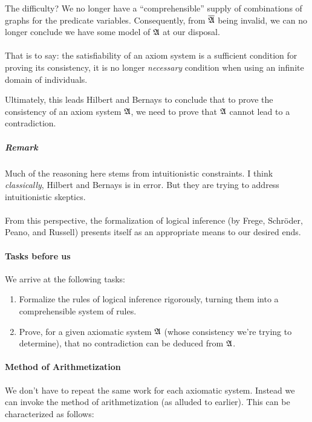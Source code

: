 The difficulty? We no longer have a ``comprehensible'' supply of
combinations of graphs for the predicate variables. Consequently, from
$\overline{\mathfrak{A}}$ being invalid, we can no longer conclude we have some
model of $\mathfrak{A}$ at our disposal.

\paragraph{}
That is to say: the satisfiability of an axiom system is a sufficient
condition for proving its consistency, it is no longer
\emph{necessary} condition when using an infinite domain of individuals.

Ultimately, this leads Hilbert and Bernays to conclude that to prove
the consistency of an axiom system $\mathfrak{A}$, we need to prove that
$\mathfrak{A}$ cannot lead to a contradiction.

\subparagraph{Remark}
Much of the reasoning here stems from intuitionistic constraints. I
think \emph{classically}, Hilbert and Bernays is in error. But they
are trying to address intuitionistic skeptics.

\paragraph{}
From this perspective, the formalization of logical inference (by
Frege, Schr\"{o}der, Peano, and Russell) presents itself as an
appropriate means to our desired ends. 

\paragraph{Tasks before us}
We arrive at the following tasks:
\begin{enumerate}
\item Formalize the rules of logical inference rigorously, turning
  them into a comprehensible system of rules.
\item Prove, for a given axiomatic system $\mathfrak{A}$ (whose
  consistency we're trying to determine), that no contradiction can be
  deduced from $\mathfrak{A}$.
\end{enumerate}

\paragraph{Method of Arithmetization}
We don't have to repeat the same work for each axiomatic system.
Instead we can invoke the method of arithmetization (as alluded to
earlier). This can be characterized as follows:

